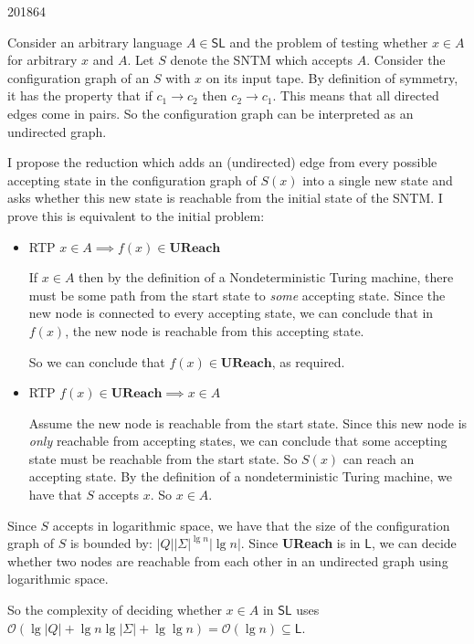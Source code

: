 \documentclass[10pt,\jkfside,a4paper]{article}
\begin{document}
\begin{examquestion}{2018}{6}{4}
\begin{enumerate}[label=(\alph*)]
Consider an arbitrary language $A \in \mathsf{SL}$ and the problem of
testing whether $x \in A$ for arbitrary $x$ and $A$. Let $S$ denote the SNTM
which accepts $A$. Consider the configuration graph of an $S$ with $x$
on its input tape. By definition of symmetry, it has the property that if $
c_1 \to c_2$ then $c_2 \to c_1$. This means that all directed edges come in
pairs. So the configuration graph can be interpreted as an undirected graph.

I propose the reduction which adds an (undirected) edge from every possible
accepting state in the configuration graph of $S(x)$ into a single new state
and asks whether this new state is reachable from the initial state of the
SNTM\@. I prove this is equivalent to the initial problem:

\begin{itemize}

\item RTP $x \in A \implies f(x) \in \textbf{UReach}$

If $x \in A$ then by the definition of a Nondeterministic Turing machine,
there must be some path from the start state to \textit{some} accepting
state. Since the new node is connected to every accepting state, we can
conclude that in $f(x)$, the new node is reachable from this accepting state.

So we can conclude that $f(x) \in \textbf{UReach}$, as required.

\item RTP $f(x) \in \textbf{UReach} \implies x \in A$

Assume the new node is reachable from the start state. Since this new node
is \textit{only} reachable from accepting states, we can conclude that some
accepting state must be reachable from the start state. So $S(x)$ can reach
an accepting state. By the definition of a nondeterministic Turing machine,
we have that $S$ accepts $x$. So $x \in A$.

\end{itemize}

Since $S$ accepts in logarithmic space, we have that the size of the
configuration graph of $S$ is bounded by: $|Q||\Sigma|^{\lg n}|\lg n|$. Since
\textbf{UReach} is in $\mathsf L$, we can decide whether two nodes are
reachable from each other in an undirected graph using logarithmic space.

So the complexity of deciding whether $x \in A$ in $\mathsf{SL}$ uses
$\mathcal O\left( \lg |Q| + \lg n\lg |\Sigma| + \lg \lg n \right) =
\mathcal O(\lg n) \subseteq \mathsf L$.

\end{enumerate}

\end{examquestion}
\end{document}
